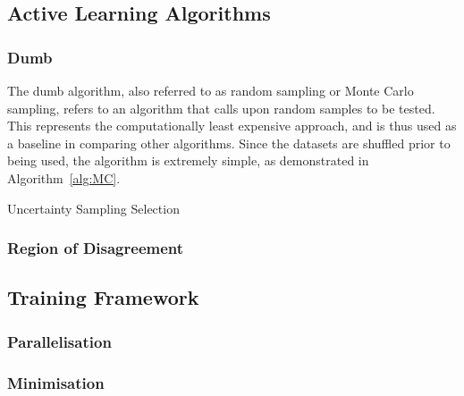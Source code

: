 \subsection{Active Learning Algorithms}
\subsubsection{Dumb}
The dumb algorithm, also referred to as random sampling or Monte Carlo sampling, refers to an algorithm that calls upon random samples to be tested. This represents the computationally least expensive approach, and is thus used as a baseline in comparing other algorithms. Since the datasets are shuffled prior to being used, the algorithm is extremely simple, as demonstrated in Algorithm~\ref{alg:MC}.

\begin{algorithm}[h]
    \caption{Uncertainty Sampling Selection}
    \label{alg:MC}\SetAlgoLined
\end{algorithm}

\subsubsection{Region of Disagreement}
\blindtext[1]
\subsection{Training Framework}
\blindtext[1]
\subsubsection{Parallelisation}
\blindtext[1]
\subsubsection{Minimisation}
\blindtext[1]

